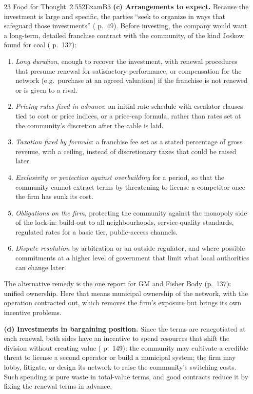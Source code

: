 \begin{exsol}{23}{\MR{} Food for Thought~2.5}{52}{Exam}{B3}
\textbf{(c) Arrangements to expect.} Because the investment is large and specific, the parties
``seek to organize in ways that safeguard those investments'' (\MR{} p.~49). Before investing,
the company would want a long-term, detailed franchise contract with the community, of the kind
Joskow found for coal (\MR{} p.~137):
\begin{enumerate}[label=(\roman*)]
  \item \emph{Long duration}, enough to recover the investment, with renewal procedures that
  presume renewal for satisfactory performance, or compensation for the network (e.g.\ purchase
  at an agreed valuation) if the franchise is not renewed or is given to a rival.
  \item \emph{Pricing rules fixed in advance}: an initial rate schedule with escalator clauses
  tied to cost or price indices, or a price-cap formula, rather than rates set at the community's
  discretion after the cable is laid.
  \item \emph{Taxation fixed by formula}: a franchise fee set as a stated percentage of gross
  revenue, with a ceiling, instead of discretionary taxes that could be raised later.
  \item \emph{Exclusivity or protection against overbuilding} for a period, so that the
  community cannot extract terms by threatening to license a competitor once the firm has sunk
  its cost.
  \item \emph{Obligations on the firm}, protecting the community against the monopoly side of
  the lock-in: build-out to all neighbourhoods, service-quality standards, regulated rates for a
  basic tier, public-access channels.
  \item \emph{Dispute resolution} by arbitration or an outside regulator, and where possible
  commitments at a higher level of government that limit what local authorities can change
  later.
\end{enumerate}
The alternative remedy is the one \MR{} report for GM and Fisher Body (p.~137): unified ownership.
Here that means municipal ownership of the network, with the operation contracted out, which
removes the firm's exposure but brings its own incentive problems.

\textbf{(d) Investments in bargaining position.} Since the terms are renegotiated at each renewal,
both sides have an incentive to spend resources that shift the division without creating value
(\MR{} p.~149): the community may cultivate a credible threat to license a second operator or
build a municipal system; the firm may lobby, litigate, or design its network to raise the
community's switching costs. Such spending is pure waste in total-value terms, and good contracts
reduce it by fixing the renewal terms in advance.


\end{exsol}
